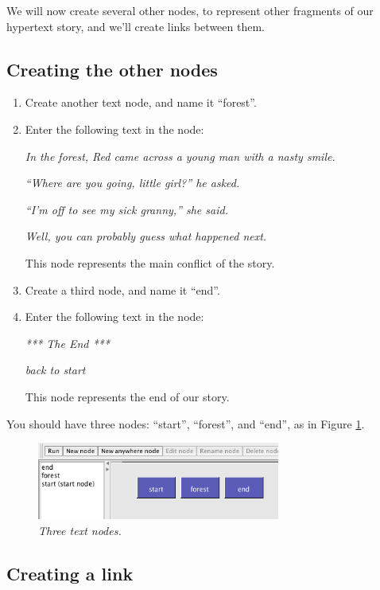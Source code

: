 \documentclass{article}
\begin{document}
We will now create several other nodes, to represent other fragments of our
hypertext story, and we'll create links between them.

\subsection{Creating the other nodes}

\begin{enumerate}
  \item Create another text node, and name it ``forest''.
  \item Enter the following text in the node:

\textit{In the forest, Red came across a young man with a nasty smile.}

\textit{``Where are you going, little girl?'' he asked.}

\textit{``I'm off to see my sick granny,'' she said.}

\textit{Well, you can probably guess what happened next.}

This node represents the main conflict of the story.

\item Create a third node, and name it ``end''.
\item Enter the following text in the node:

\textit{*** The End ***}

\textit{back to start}

This node represents the end of our story.
\end{enumerate}

You should have three nodes: ``start'', ``forest'', and ``end'', as in
Figure \ref{fig:three_nodes}.

 
\begin{figure}[ht]
  \centering
  \includegraphics[width=8cm]{images/hypedyn-tutorial-1-figure-6}
  \caption{\textit{Three text nodes.}}
  \label{fig:three_nodes}
\end{figure} 

\subsection{Creating a link}
\end{document}
